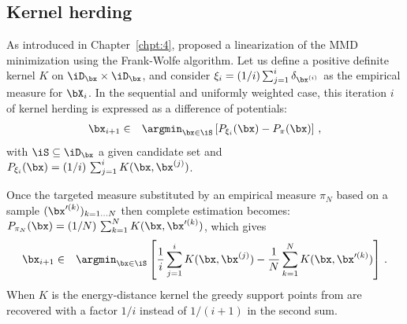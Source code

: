 \subsection{Kernel herding}\label{sec:C5_KH}
As introduced in Chapter~\ref{chpt:4}, \citet{lacoste_2015} proposed a linearization of the MMD minimization using the Frank-Wolfe algorithm. 
Let us define a positive definite kernel $K$ on $\iD_\bx\times\iD_\bx$, and consider $\xi_i=(1/i)\sum_{j=1}^i \delta_{\bx^{(i)}}$ as the empirical measure for $\bX_i$.  
In the sequential and uniformly weighted case, this iteration $i$ of kernel herding is expressed as a difference of potentials: 
\begin{eqnarray}\label{eq:KH}
\bx_{i+1} &\in& \argmin_{\bx\in\iS} \left[P_{\xi_i}(\bx)-P_{\pi}(\bx)\right] \,,
\end{eqnarray}
with $\iS\subseteq\iD_\bx$ a given candidate set and $P_{\xi_i}(\bx) = (1/i)\, \sum_{j=1}^i K(\bx, \bx^{(j)})$. 

Once the targeted measure substituted by an empirical measure $\pi_N$ based on a sample $(\bx'^{(k)})_{k=1\ldots N}$ then complete estimation becomes: 
$P_{\pi_N}(\bx) = (1/N)\, \sum_{k=1}^N K(\bx, \bx'^{(k)})$, which gives
\begin{eqnarray*}
\bx_{i+1} &\in& \argmin_{\bx\in\iS} \left[ \frac{1}{i} \sum_{j=1}^{i} K(\bx,\bx^{(j)}) - \frac{1}{N} \sum_{k=1}^N K(\bx,\bx'^{(k)}) \right] \,.
\end{eqnarray*}
When $K$ is the energy-distance kernel  the greedy support points from  are recovered with a factor $1/i$ instead of $1/(i+1)$ in the second sum. 

